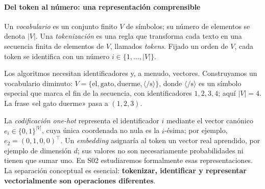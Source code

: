 \paragraph{Del token al número: una representación comprensible}
\begin{definicion}\label{s01:def:vocabulario}
Un \emph{vocabulario} es un conjunto finito $V$ de símbolos; su número de
elementos se denota $|V|$. Una \emph{tokenización} es una regla que transforma
cada texto en una secuencia finita de elementos de $V$, llamados \emph{tokens}.
Fijado un orden de $V$, cada token se identifica con un número
$i\in\{1,\ldots,|V|\}$.
\end{definicion}
Los algoritmos necesitan identificadores y, a menudo, vectores. Construyamos un vocabulario diminuto: $V=\{\text{el},\text{gato},\text{duerme},\langle/\mathrm s\rangle\}$, donde $\langle/\mathrm s\rangle$ es un símbolo especial que marca el fin de la secuencia, con identificadores $1,2,3,4$; aquí $|V|=4$. La frase «el gato duerme» pasa a $(1,2,3)$.
\begin{center}
\end{center}
La \emph{codificación one-hot} representa el identificador $i$ mediante el vector canónico $e_i\in\{0,1\}^{|V|}$, cuya única coordenada no nula es la $i$-ésima; por ejemplo, $e_2=(0,1,0,0)^\top$. Un \emph{embedding} asignaría al token un vector real aprendido, por ejemplo de dimensión $d$; sus valores no son necesariamente probabilidades ni tienen que sumar uno. En S02 estudiaremos formalmente esas representaciones. La separación conceptual es esencial: \textbf{tokenizar, identificar y representar vectorialmente son operaciones diferentes}.

